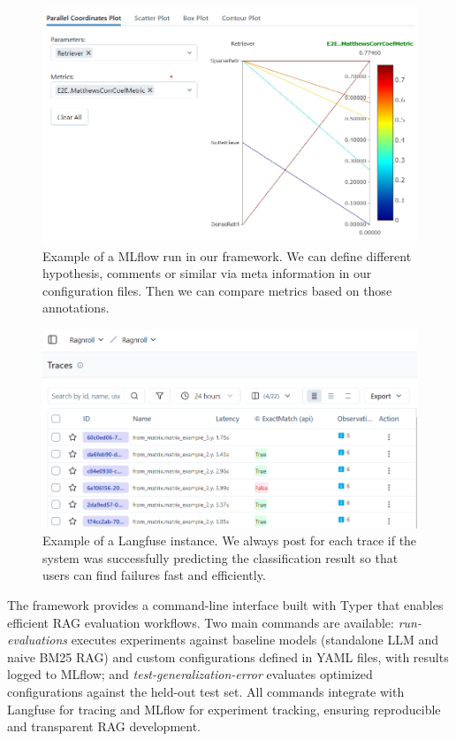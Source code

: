 \begin{figure}
  \centering
  \includegraphics[width=\textwidth]{images/MLFlow-Vis.png}
  \caption{Example of a MLflow run in our framework. We can define different hypothesis, comments or similar via meta information in our configuration files. Then we can compare metrics based on those annotations.}
  \label{fig:mlflow}
\end{figure}

\begin{figure}
\centering
\includegraphics[width=\textwidth]{images/langfuse.png}
\caption{Example of a Langfuse instance. We always post for each trace if the system was successfully predicting the classification result so that users can find failures fast and efficiently.}
\label{fig:langfuse}
\end{figure}

The framework provides a command-line interface built with Typer that enables efficient RAG evaluation workflows. Two main commands are available: \textit{run-evaluations} executes experiments against baseline models (standalone LLM and naive BM25 RAG) and custom configurations defined in YAML files, with results logged to MLflow; and \textit{test-generalization-error} evaluates optimized configurations against the held-out test set. All commands integrate with Langfuse for tracing and MLflow for experiment tracking, ensuring reproducible and transparent RAG development.

